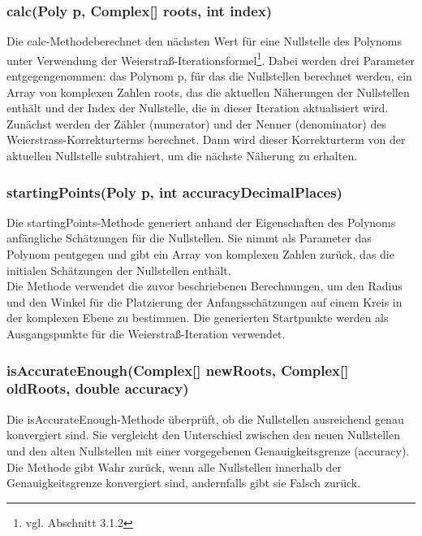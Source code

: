\documentclass[12pt]{article}
\begin{document}
\subsubsection*{calc(Poly p, Complex[] roots, int index)}
Die \glqq calc-Methode\grqq\space berechnet den nächsten Wert für eine Nullstelle des Polynoms unter Verwendung der Weierstraß-Iterationsformel\footnote{
    vgl. Abschnitt 3.1.2
}. Dabei werden drei Parameter entgegengenommen: das Polynom \glqq p\grqq, für das die Nullstellen berechnet werden, ein Array von komplexen Zahlen \glqq roots\grqq, das die aktuellen Näherungen der Nullstellen enthält und der Index der Nullstelle, die in dieser Iteration aktualisiert wird.\\
Zunächst werden der Zähler (\glqq numerator\grqq) und der Nenner (\glqq denominator\grqq) des Weierstrass-Korrekturterms berechnet. Dann wird dieser Korrekturterm von der aktuellen Nullstelle subtrahiert, um die nächste Näherung zu erhalten.

\subsubsection*{startingPoints(Poly p, int accuracyDecimalPlaces)}
Die \glqq startingPoints\grqq-Methode generiert anhand der Eigenschaften des Polynoms anfängliche Schätzungen für die Nullstellen. Sie nimmt als Parameter das Polynom \glqq p\grqq\space entgegen und gibt ein Array von komplexen Zahlen zurück, das die initialen Schätzungen der Nullstellen enthält.\\
Die Methode verwendet die zuvor beschriebenen Berechnungen, um den Radius und den Winkel für die Platzierung der Anfangsschätzungen auf einem Kreis in der komplexen Ebene zu bestimmen. Die generierten Startpunkte werden als Ausgangspunkte für die Weierstraß-Iteration verwendet.

\subsubsection*{isAccurateEnough(Complex[] newRoots, Complex[] oldRoots, double accuracy)}
Die \glqq isAccurateEnough\grqq-Methode überprüft, ob die Nullstellen ausreichend genau konvergiert sind. Sie vergleicht den Unterschied zwischen den neuen Nullstellen und den alten Nullstellen mit einer vorgegebenen Genauigkeitsgrenze (\glqq accuracy\grqq).\\
Die Methode gibt Wahr zurück, wenn alle Nullstellen innerhalb der Genauigkeitsgrenze konvergiert sind, andernfalls gibt sie Falsch zurück.
\end{document}
